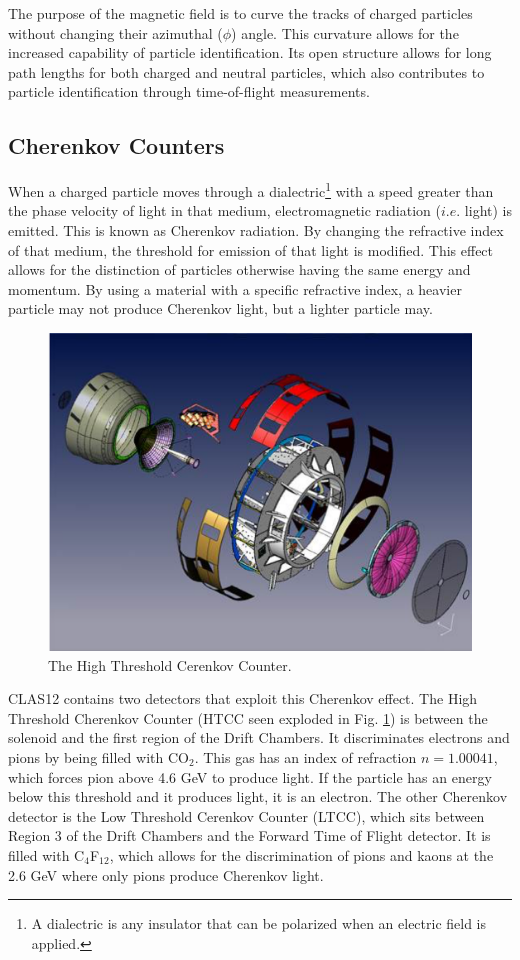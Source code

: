 The purpose of the magnetic field is to curve the tracks of charged particles without changing their azimuthal ($\phi$) angle. This curvature allows for the increased capability of particle identification. Its open structure allows for long path lengths for both charged and neutral particles, which also contributes to particle identification through time-of-flight measurements.

\subsection{Cherenkov Counters}
When a charged particle moves through a dialectric\footnote{A dialectric is any insulator that can be polarized when an electric field is applied.} with a speed greater than the phase velocity of light in that medium, electromagnetic radiation ($i.e.$ light) is emitted. This is known as Cherenkov radiation. By changing the refractive index of that medium, the threshold for emission of that light is modified. This effect allows for the distinction of particles otherwise having the same energy and momentum. By using a material with a specific refractive index, a heavier particle may not produce Cherenkov light, but a lighter particle may.

\begin{figure}
	\centering
	\includegraphics[width=0.9\linewidth]{figures/htcc.png}
	\caption{\label{fig:htcc}The High Threshold Cerenkov Counter.}
\end{figure}
CLAS12 contains two detectors that exploit this Cherenkov effect. The High Threshold Cherenkov Counter (HTCC seen exploded in Fig. \ref{fig:htcc}) is between the solenoid and the first region of the Drift Chambers. It discriminates electrons and pions by being filled with CO$_2$. This gas has an index of refraction $n=1.00041$, which forces pion above 4.6 GeV to produce light. If the particle has an energy below this threshold and it produces light, it is an electron. The other Cherenkov detector is the Low Threshold Cerenkov Counter (LTCC), which sits between Region 3 of the Drift Chambers and the Forward Time of Flight detector. It is filled with C$_4$F$_{12}$, which allows for the discrimination of pions and kaons at the 2.6 GeV where only pions produce Cherenkov light.

